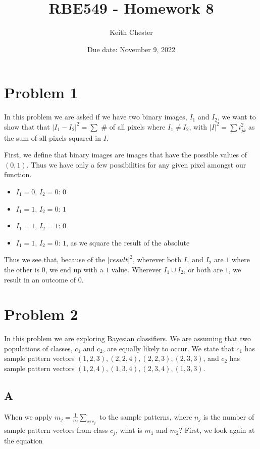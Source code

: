 \documentclass{article}
\title{RBE549 - Homework 8}
\author{Keith Chester}
\date{Due date: November 9, 2022}
\begin{document}
\maketitle

\section*{Problem 1}

In this problem we are asked if we have two binary images, $I_1$ and $I_2$, we want to show that that $|I_1 - I_2|^2 = \sum $ \# of all pixels where $I_1 \neq I_2$, with $|I|^2 = \sum i^2_{jk}$ as the sum of all pixels squared in $I$.

First, we define that binary images are images that have the possible values of $(0, 1)$. Thus we have only a few possibilities for any given pixel amongst our function.

\begin{itemize}
    \item $I_1=0$, $I_2=0$: $0$
    \item $I_1=1$, $I_2=0$: $1$
    \item $I_1=1$, $I_2=1$: $0$
    \item $I_1=1$, $I_2=0$: $1$, as we square the result of the absolute
\end{itemize}

Thus we see that, because of the $|result|^2$, wherever both $I_1$ and $I_2$ are $1$ where the other is $0$, we end up with a $1$ value. Wherever $I_1 \cup I_2$, or both are $1$, we result in an outcome of $0$.

\section*{Problem 2}

In this problem we are exploring Bayesian classifiers. We are assuming that two populations of classes, $c_1$ and $c_2$, are equally likely to occur. We state that $c_1$ has sample pattern vectors $(1,2,3),(2,2,4),(2,2,3), (2,3,3)$, and $c_2$ has sample pattern vectors $(1,2,4),(1,3,4),(2,3,4),(1,3,3)$.

\subsection*{A}

When we apply $m_j=\frac{1}{n_j} \sum_{x \epsilon c_j}$ to the sample patterns, where $n_j$ is the number of sample pattern vectors from class $c_j$, what is $m_1$ and $m_2$? First, we look again at the equation
\end{document}
